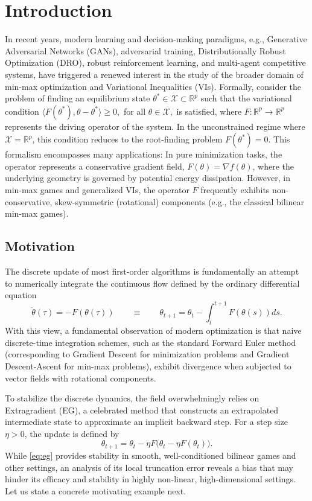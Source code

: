 \documentclass[letter,11pt]{article}
\begin{document}
\section{Introduction}
In recent years, modern learning and decision-making paradigms, e.g., Generative Adversarial Networks (GANs), adversarial training, Distributionally Robust Optimization (DRO), robust reinforcement learning, and multi-agent competitive systems, have triggered a renewed interest in the study of the broader domain of min-max optimization and Variational Inequalities (VIs).
Formally, consider the problem of finding an equilibrium state $\theta^* \in \mathcal{X} \subset \mathbb{R}^p$ such that the variational condition $\langle F(\theta^*), \theta - \theta^* \rangle \ge 0,$ for all $\theta \in \mathcal{X},$ is satisfied,
where $F: \mathbb{R}^p \to \mathbb{R}^p$ represents the driving operator of the system. In the unconstrained regime where $\mathcal{X} = \mathbb{R}^p$, this condition reduces to the root-finding problem $F(\theta^*) = 0.$
This formalism encompasses many applications:
In pure minimization tasks, the operator represents a conservative gradient field, $F(\theta) = \nabla f(\theta)$, where the underlying geometry is governed by potential energy dissipation. However, in min-max games and generalized VIs, the operator $F$ frequently exhibits non-conservative, skew-symmetric (rotational) components (e.g., the classical bilinear min-max games). 

\subsection{Motivation}\label{sec:motivation}
The discrete update of most first-order algorithms is fundamentally an attempt to numerically integrate the continuous flow defined by the ordinary differential equation
\begin{equation} \label{eq:continuous_flow}
\dot{\theta}(\tau) = -F(\theta(\tau)) \qquad \equiv \qquad \theta_{t+1} = \theta_t - \int_{t}^{t+1} F(\theta(s)) ds.
\end{equation}
With this view, a fundamental observation of modern optimization is that naive discrete-time integration schemes, such as the standard Forward Euler method (corresponding to Gradient Descent for minimization problems and Gradient Descent-Ascent for min-max problems), exhibit divergence when subjected to vector fields with rotational components. 

To stabilize the discrete dynamics, the field overwhelmingly relies on Extragradient (EG), a celebrated method that constructs an extrapolated intermediate state to approximate an implicit backward step. For a step size $\eta > 0$, the update is defined by
\begin{equation} \label{eq:eg}
\tag{EG}
\theta_{t+1} = \theta_t - \eta F\big(\theta_t - \eta F(\theta_t)\big).
\end{equation}
While \eqref{eq:eg} provides stability in smooth, well-conditioned bilinear games and other settings, an analysis of its local truncation error reveals a bias that may hinder its efficacy and stability in highly non-linear, high-dimensional settings. Let us state a concrete motivating example next.
\end{document}
